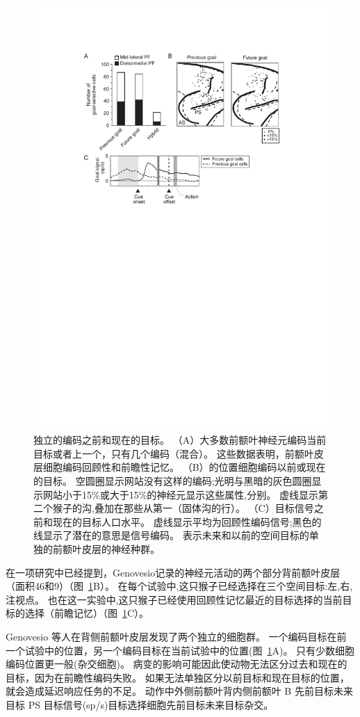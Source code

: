 \begin{figure}
	\centering
	\includegraphics[width=0.7\linewidth]{chap6/6_7}
	\caption{独立的编码之前和现在的目标。
		（A）大多数前额叶神经元编码当前目标或者上一个，只有几个编码（混合）。
		这些数据表明，前额叶皮层细胞编码回顾性和前瞻性记忆。
		（B）的位置细胞编码以前或现在的目标。
		空圆圈显示网站没有这样的编码;光明与黑暗的灰色圆圈显示网站小于15\%或大于15\%的神经元显示这些属性,分别。
		虚线显示第二个猴子的沟,叠加在那些从第一（固体沟的行）。
		（C）目标信号之前和现在的目标人口水平。
		虚线显示平均为回顾性编码信号;黑色的线显示了潜在的意思是信号编码\cite{genovesio2006representation}。
		表示未来和以前的空间目标的单独的前额叶皮层的神经种群。}
	\label{fig:6_7}
\end{figure}


在一项研究中已经提到，Genovesio\cite{genovesio2006representation}记录的神经元活动的两个部分背前额叶皮层（面积46和9）（图~\ref{fig:6_7}B）。
在每个试验中,这只猴子已经选择在三个空间目标:左,右,注视点。
也在这一实验中,这只猴子已经使用回顾性记忆最近的目标选择的当前目标的选择（前瞻记忆）（图~\ref{fig:6_7}C）。


Genovesio 等人在背侧前额叶皮层发现了两个独立的细胞群。
一个编码目标在前一个试验中的位置，另一个编码目标在当前试验中的位置(图~\ref{fig:6_7}A)。
只有少数细胞编码位置更一般(杂交细胞)。
病变的影响可能因此使动物无法区分过去和现在的目标，因为在前瞻性编码失败。
如果无法单独区分以前目标和现在目标的位置，就会造成延迟响应任务的不足。
动作中外侧前额叶背内侧前额叶 B 先前目标未来目标 PS 目标信号(sp/s)目标选择细胞先前目标未来目标杂交。


